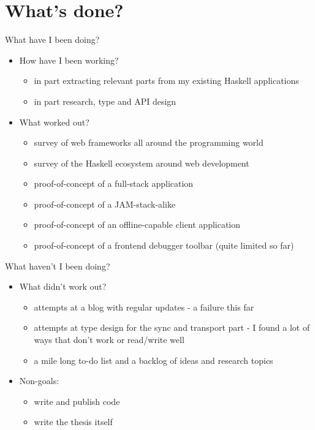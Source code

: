 \documentclass[presentation]{beamer}
\begin{document}
\section{What's done?}
\label{sec:org8f6475e}
\begin{frame}[label={sec:orgcdc5b04}]{What have I been doing?}
\begin{itemize}
\item How have I been working?
\begin{itemize}
\item in part extracting relevant parts from my existing Haskell applications
\item in part research, type and API design
\end{itemize}
\end{itemize}

\pause

\begin{itemize}
\item What worked out?
\begin{itemize}
\item survey of web frameworks all around the programming world
\item survey of the Haskell ecosystem around web development
\item proof-of-concept of a full-stack application
\item proof-of-concept of a JAM-stack-alike
\item proof-of-concept of an offline-capable client application
\item proof-of-concept of a frontend debugger toolbar (quite limited so far)
\end{itemize}
\end{itemize}
\end{frame}

\begin{frame}[label={sec:orgbd585d0}]{What haven't I been doing?}
\begin{itemize}
\item What didn't work out?
\begin{itemize}
\item attempts at a blog with regular updates - a failure this far
\item attempts at type design for the sync and transport part - I found a lot of
ways that don't work or read/write well
\item a mile long to-do list and a backlog of ideas and research topics
\end{itemize}
\end{itemize}

\pause

\begin{itemize}
\item Non-goals:
\begin{itemize}
\item write and publish code
\item write the thesis itself
\end{itemize}
\end{itemize}
\end{frame}
\end{document}
